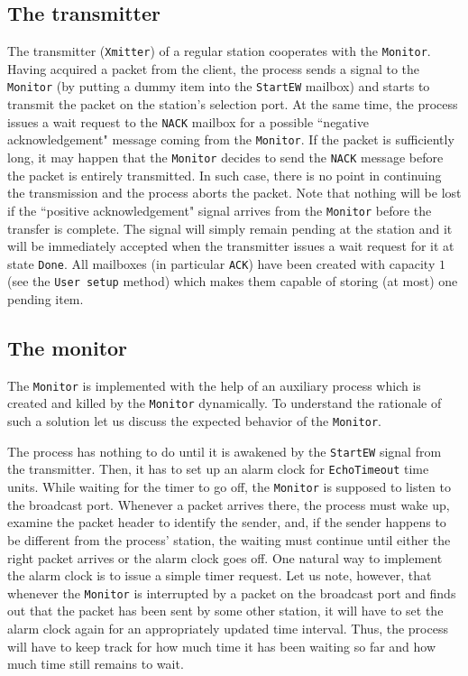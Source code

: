 \subsection{The transmitter}

The transmitter ({\tt Xmitter}) of a regular station cooperates with the
{\tt Monitor}.
Having acquired a packet from the client, the process sends a signal to the
{\tt Monitor} (by putting a dummy item into the {\tt StartEW} mailbox)
and starts to transmit the packet on the station's selection port.
At the same time, the process issues a wait request to the {\tt NACK}
mailbox for a possible ``negative acknowledgement" message coming from the
{\tt Monitor}.
If the packet is sufficiently long, it may happen that the
{\tt Monitor} decides to send the {\tt NACK} message before the
packet is entirely transmitted.
In such case, there is no point in continuing the transmission and the
process aborts the packet.
Note that nothing will be lost if the ``positive acknowledgement"
signal arrives from the {\tt Monitor} before the transfer is complete.
The signal will simply remain pending at the station
and it will be immediately accepted when the
transmitter issues a wait request
for it at state {\tt Done}.
All mailboxes (in particular {\tt ACK}) have been created with capacity
$1$ (see the {\tt User setup} method) which makes them capable of storing
(at most) one pending item.

\subsection{The monitor}

The {\tt Monitor} is implemented with the help of an auxiliary process which
is created and killed by the {\tt Monitor} dynamically.
To understand the rationale of such a solution let us discuss the
expected behavior of the {\tt Monitor}.

The process has nothing to do until it is awakened by the
{\tt StartEW} signal from the transmitter.
Then, it has to set up an alarm clock for {\tt EchoTimeout} time units.
While waiting for the timer to go off, the {\tt Monitor} is supposed to
listen to the broadcast port.
Whenever a packet arrives there, the process must wake up, examine
the packet header to identify the sender, and, if the sender happens to
be different from the process' station, the waiting must continue until
either the right packet arrives or the alarm clock goes off.
One natural way to implement the alarm clock is to issue a
simple timer request.
Let us note, however, that whenever the {\tt Monitor} is interrupted by a
packet
on the broadcast port and finds out that the packet has been sent
by some other station, it
will have to set the alarm clock again for an appropriately updated time
interval.
Thus, the process will have to keep track for how much time it has been
waiting so far and how much time still remains to wait.

